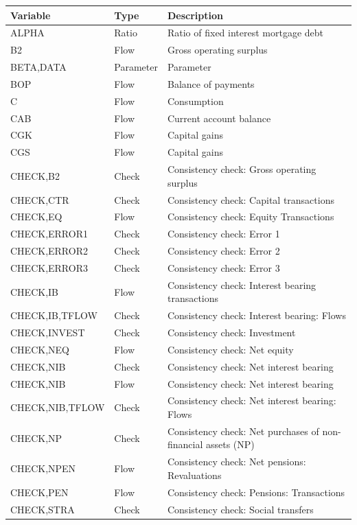 \documentclass[
]{book}
\begin{document}
\begin{tabular}[t]{l|l|l}
\hline
Variable & Type & Description\\
\hline
ALPHA & Ratio & Ratio of fixed interest mortgage debt\\
\hline
B2 & Flow & Gross operating surplus\\
\hline
BETA,DATA & Parameter & Parameter\\
\hline
BOP & Flow & Balance of payments\\
\hline
C & Flow & Consumption\\
\hline
CAB & Flow & Current account balance\\
\hline
CGK & Flow & Capital gains\\
\hline
CGS & Flow & Capital gains\\
\hline
CHECK,B2 & Check & Consistency check: Gross operating surplus\\
\hline
CHECK,CTR & Check & Consistency check: Capital transactions\\
\hline
CHECK,EQ & Flow & Consistency check: Equity Transactions\\
\hline
CHECK,ERROR1 & Check & Consistency check: Error 1\\
\hline
CHECK,ERROR2 & Check & Consistency check: Error 2\\
\hline
CHECK,ERROR3 & Check & Consistency check: Error 3\\
\hline
CHECK,IB & Flow & Consistency check: Interest bearing transactions\\
\hline
CHECK,IB,TFLOW & Check & Consistency check: Interest bearing: Flows\\
\hline
CHECK,INVEST & Check & Consistency check: Investment\\
\hline
CHECK,NEQ & Flow & Consistency check: Net equity\\
\hline
CHECK,NIB & Check & Consistency check: Net interest bearing\\
\hline
CHECK,NIB & Flow & Consistency check: Net interest bearing\\
\hline
CHECK,NIB,TFLOW & Check & Consistency check: Net interest bearing: Flows\\
\hline
CHECK,NP & Check & Consistency check: Net purchases of non-financial assets (NP)\\
\hline
CHECK,NPEN & Flow & Consistency check: Net pensions: Revaluations\\
\hline
CHECK,PEN & Flow & Consistency check: Pensions: Transactions\\
\hline
CHECK,STRA & Check & Consistency check: Social transfers\\

\end{tabular}
\end{document}
